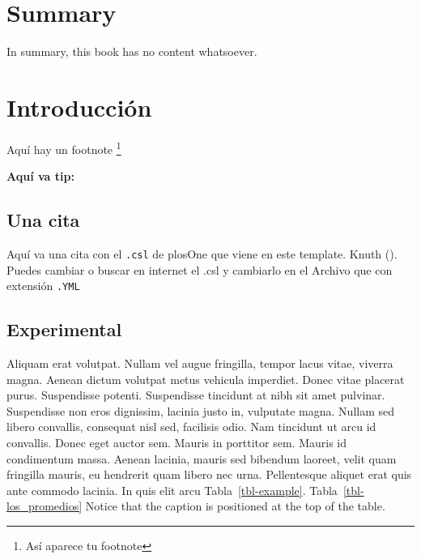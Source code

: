 \documentclass[
  12pt,
  letterpaper,
  DIV=11,
  numbers=noendperiod,
  oneside]{scrreport}
\begin{document}

\chapter{Summary}\label{summary}

In summary, this book has no content whatsoever.


\chapter{Introducción}\label{sec-Introduccion}

Aquí hay un footnote \footnote{Así aparece tu footnote}

\begin{tcolorbox}[enhanced jigsaw, bottomrule=.15mm, toprule=.15mm, opacityback=0, rightrule=.15mm, colback=white, breakable, left=2mm, arc=.35mm, colframe=quarto-callout-tip-color-frame, leftrule=.75mm]

\vspace{-3mm}\textbf{Aquí va tip:}\vspace{3mm}

\end{tcolorbox}

\section{Una cita}\label{una-cita}

Aquí va una cita con el \texttt{.csl} de plosOne que viene en este
template. Knuth (). Puedes cambiar o buscar
en internet el .csl y cambiarlo en el Archivo que con extensión
\texttt{.YML}

\section{Experimental}\label{experimental}

Aliquam erat volutpat. Nullam vel augue fringilla, tempor lacus vitae,
viverra magna. Aenean dictum volutpat metus vehicula imperdiet. Donec
vitae placerat purus. Suspendisse potenti. Suspendisse tincidunt at nibh
sit amet pulvinar. Suspendisse non eros dignissim, lacinia justo in,
vulputate magna. Nullam sed libero convallis, consequat nisl sed,
facilisis odio. Nam tincidunt ut arcu id convallis. Donec eget auctor
sem. Mauris in porttitor sem. Mauris id condimentum massa. Aenean
lacinia, mauris sed bibendum laoreet, velit quam fringilla mauris, eu
hendrerit quam libero nec urna. Pellentesque aliquet erat quis ante
commodo lacinia. In quis elit arcu Tabla~\ref{tbl-example}.
Tabla~\ref{tbl-los_promedios} Notice that the caption is positioned at
the top of the table.
\end{document}
